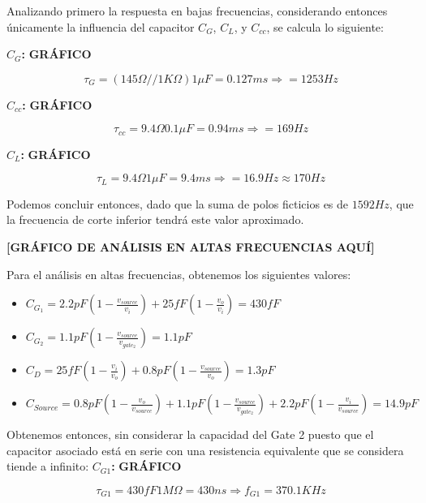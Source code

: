 \documentclass[a4paper, 10pt, spanish]{article}
\begin{document}
Analizando primero la respuesta en bajas frecuencias, considerando entonces únicamente la influencia del capacitor $C_G$, $C_L$, y $C_{cc}$, se calcula lo siguiente:

\textbf{$C_G$:}
\textbf{GRÁFICO}

\begin{equation}
  \tau_G = (145\Omega//1K\Omega) 1\mu F = 0.127ms \Rightarrow = 1253 Hz
\end{equation}

\textbf{$C_{cc}$:}
\textbf{GRÁFICO}

\begin{equation}
  \tau_{cc} = 9.4\Omega 0.1\mu F = 0.94ms \Rightarrow = 169 Hz
\end{equation}

\textbf{$C_L$:}
\textbf{GRÁFICO}

\begin{equation}
  \tau_L = 9.4\Omega 1\mu F = 9.4ms \Rightarrow = 16.9 Hz \approx 170 Hz
\end{equation}

Podemos concluir entonces, dado que la suma de polos ficticios es de $1592Hz$, que la frecuencia de corte inferior tendrá este valor aproximado.

\textbf{[GRÁFICO DE ANÁLISIS EN ALTAS FRECUENCIAS AQUÍ]}

Para el análisis en altas frecuencias, obtenemos los siguientes valores:

\begin{itemize}
  \item $C_{G_1}=2.2pF(1-\frac{v_{source}}{v_i})+25fF(1-\frac{v_o}{v_i}) = 430fF$
  \item $C_{G_2}=1.1pF(1-\frac{v_{source}}{v_{gate_2}}) = 1.1pF$
  \item $C_{D}=25fF(1-\frac{v_i}{v_o})+0.8pF(1-\frac{v_{source}}{v_o}) = 1.3pF$
  \item $C_{Source}=0.8pF(1-\frac{v_o}{v_{source}})+1.1pF(1-\frac{v_{source}}{v_{gate_2}})+2.2pF(1-\frac{v_i}{v_{source}}) = 14.9pF$
\end{itemize}

Obtenemos entonces, sin considerar la capacidad del Gate 2 puesto que el capacitor asociado está en serie con una resistencia equivalente que se considera tiende a infinito:
\textbf{$C_{G1}$:}
\textbf{GRÁFICO}

\begin{equation}
  \tau_{G1} = 430fF 1M\Omega = 430ns \Rightarrow f_{G1} = 370.1 KHz
\end{equation}
\end{document}
